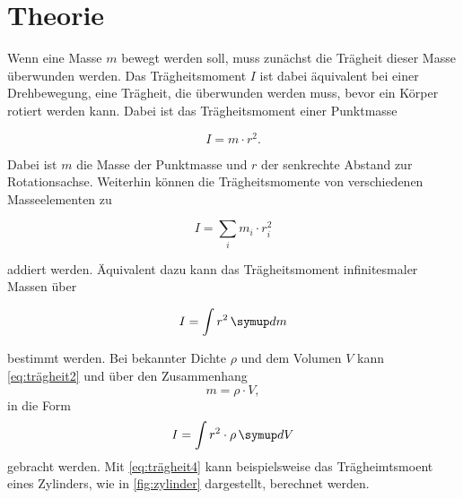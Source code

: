 \section{Theorie}
\label{sec:Theorie}




Wenn eine Masse $m$ bewegt werden soll, muss zunächst die Trägheit dieser Masse überwunden werden. Das Trägheitsmoment $I$ ist dabei äquivalent bei einer Drehbewegung, eine Trägheit, die überwunden werden muss, bevor ein Körper rotiert werden kann. Dabei ist das Trägheitsmoment einer Punktmasse

\begin{equation}
    I = m \cdot r^2.
    \label{eq:trägheit1}
\end{equation}

Dabei ist $m$ die Masse der Punktmasse und $r$ der senkrechte Abstand zur Rotationsachse. Weiterhin können die Trägheitsmomente von verschiedenen Masseelementen zu 

\begin{equation}
    I = \sum _i m_i \cdot r_i^2
    \label{eq:trägheit2}
\end{equation}

addiert werden. Äquivalent dazu kann das Trägheitsmoment infinitesmaler Massen über 

\begin{equation}
    I = \int r^2 \dif{m}
    \label{eq:trägheit3}
\end{equation}

bestimmt werden. Bei bekannter Dichte $\rho$ und dem Volumen $V$ kann \autoref{eq:trägheit2} und über den Zusammenhang
\begin{equation}
    m = \rho \cdot V,
    \label{eq:dichte}
\end{equation}
in die Form 
\begin{equation}
    I = \int r^2 \cdot \rho \dif{V}
    \label{eq:trägheit4}
\end{equation}
gebracht werden. 
Mit \autoref{eq:trägheit4} kann beispielsweise das Trägheimtsmoent eines Zylinders, wie in \autoref{fig:zylinder} dargestellt, berechnet werden.


